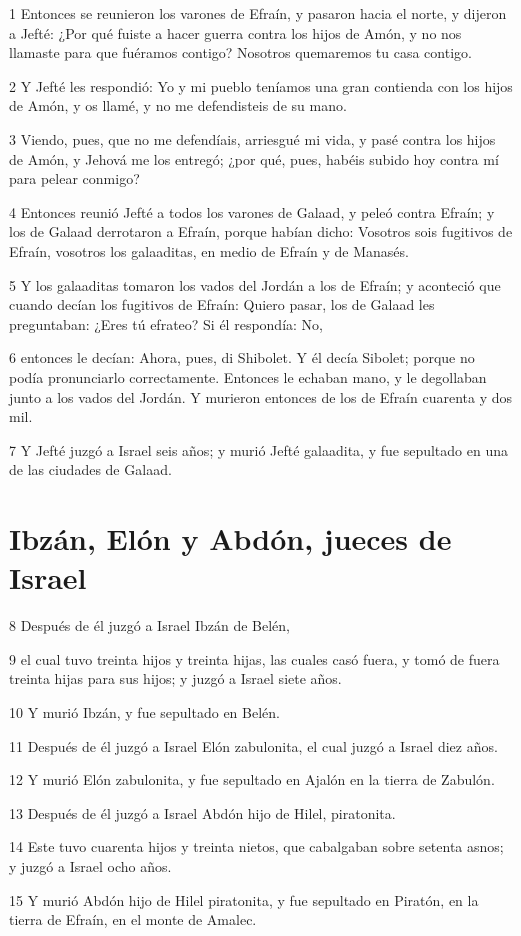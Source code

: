 \par 1 Entonces se reunieron los varones de Efraín, y pasaron hacia el norte, y dijeron a Jefté: ¿Por qué fuiste a hacer guerra contra los hijos de Amón, y no nos llamaste para que fuéramos contigo? Nosotros quemaremos tu casa contigo.
\par 2 Y Jefté les respondió: Yo y mi pueblo teníamos una gran contienda con los hijos de Amón, y os llamé, y no me defendisteis de su mano.
\par 3 Viendo, pues, que no me defendíais, arriesgué mi vida, y pasé contra los hijos de Amón, y Jehová me los entregó; ¿por qué, pues, habéis subido hoy contra mí para pelear conmigo?
\par 4 Entonces reunió Jefté a todos los varones de Galaad, y peleó contra Efraín; y los de Galaad derrotaron a Efraín, porque habían dicho: Vosotros sois fugitivos de Efraín, vosotros los galaaditas, en medio de Efraín y de Manasés.
\par 5 Y los galaaditas tomaron los vados del Jordán a los de Efraín; y aconteció que cuando decían los fugitivos de Efraín: Quiero pasar, los de Galaad les preguntaban: ¿Eres tú efrateo? Si él respondía: No,
\par 6 entonces le decían: Ahora, pues, di Shibolet. Y él decía Sibolet; porque no podía pronunciarlo correctamente. Entonces le echaban mano, y le degollaban junto a los vados del Jordán. Y murieron entonces de los de Efraín cuarenta y dos mil.
\par 7 Y Jefté juzgó a Israel seis años; y murió Jefté galaadita, y fue sepultado en una de las ciudades de Galaad.

\section*{Ibzán, Elón y Abdón, jueces de Israel}

\par 8 Después de él juzgó a Israel Ibzán de Belén,
\par 9 el cual tuvo treinta hijos y treinta hijas, las cuales casó fuera, y tomó de fuera treinta hijas para sus hijos; y juzgó a Israel siete años.
\par 10 Y murió Ibzán, y fue sepultado en Belén.
\par 11 Después de él juzgó a Israel Elón zabulonita, el cual juzgó a Israel diez años.
\par 12 Y murió Elón zabulonita, y fue sepultado en Ajalón en la tierra de Zabulón.
\par 13 Después de él juzgó a Israel Abdón hijo de Hilel, piratonita.
\par 14 Este tuvo cuarenta hijos y treinta nietos, que cabalgaban sobre setenta asnos; y juzgó a Israel ocho años.
\par 15 Y murió Abdón hijo de Hilel piratonita, y fue sepultado en Piratón, en la tierra de Efraín, en el monte de Amalec.

